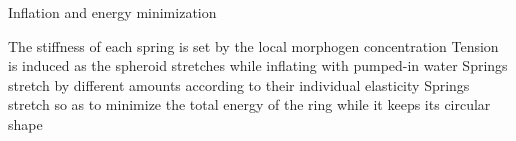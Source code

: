 


\begin{frame}{Inflation and energy minimization}

  \vspace{0.10cm}

  \begin{center}
    \begin{minipage}{0.82\linewidth}
        {The stiffness of each spring is set by the local morphogen concentration}
      \vspace{0.50cm}
        {Tension is induced as the spheroid stretches while inflating with pumped-in water}
      \vspace{0.50cm}
        {Springs stretch by different amounts according to their individual elasticity}
      \vspace{0.50cm}
        {Springs stretch so as to minimize the total energy of the ring while it keeps its circular shape}
    \end{minipage}
  \end{center}

\end{frame}


